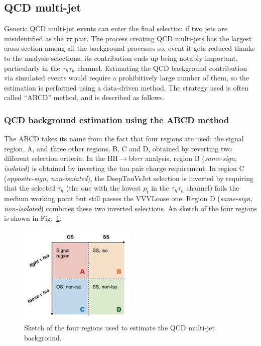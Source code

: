 \documentclass[../main.tex]{subfiles}
\begin{document}
\subsection{QCD multi-jet}
\label{hh:subs:qcd}


Generic QCD multi-jet events can enter the final selection if two jets are misidentified as the $\tau\tau$ pair. The process creating QCD multi-jets has the largest cross section among all the background processes so, event it gets reduced thanks to the analysis selections, its contribution ends up being notably important, particularly in the $\tau_h\tau_h$ channel. Estimating the QCD background contribution via simulated events would require a prohibitively large number of them, so the estimation is performed using a data-driven method. The strategy used is often called ``ABCD'' method, and is described as follows.


\subsubsection{QCD background estimation using the ABCD method}

The ABCD takes its name from the fact that four regions are used: the signal region, A, and three other regions, B, C and D, obtained by reverting two different selection criteria. In the HH$\to$bb$\tau\tau$ analysis, region B (\textit{same-sign, isolated}) is obtained by inverting the tau pair charge requirement. In region C (\textit{opposite-sign, non-isolated}), the DeepTauVsJet selection is inverted by requiring that the selected $\tau_h$ (the one with the lowest $p_t$ in the $\tau_h\tau_h$ channel) fails the medium working point but still passes the VVVLoose one. Region D (\textit{same-sign, non-isolated}) combines these two inverted selections. An sketch of the four regions is shown in Fig.~\ref{hh:fig:qcd_sketch}.

\begin{figure}[h!]
\begin{center}
\includegraphics[width=0.5\textwidth]{Images/QCDschema}
\end{center}
\caption{Sketch of the four regions used to estimate the QCD multi-jet background.}
\label{hh:fig:qcd_sketch}
\end{figure}
\end{document}
